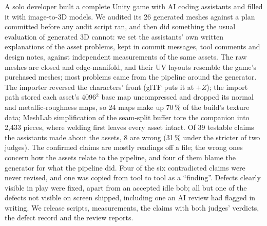 A solo developer built a complete Unity game with AI coding assistants and filled
it with image-to-3D models. We audited its 26 generated meshes against a plan
committed before any audit script ran, and then did something the usual
evaluation of generated 3D cannot: we set the assistants' own written
explanations of the asset problems, kept in commit messages, tool comments and
design notes, against independent measurements of the same assets. The raw
meshes are closed and edge-manifold, and their UV layouts resemble the game's
purchased meshes; most problems came from the pipeline around the generator. The
importer reversed the characters' front (glTF puts it at $+Z$); the import path
stored each asset's 4096$^2$ base map uncompressed and dropped its normal and
metallic-roughness maps, so 24 maps make up 70\,\% of the build's texture data;
MeshLab simplification of the seam-split buffer tore the companion into 2,433
pieces, where welding first leaves every asset intact. Of 39 testable claims the
assistants made about the assets, 8 are wrong (31\,\% under the stricter of two
judges). The confirmed claims are mostly readings off a file; the wrong ones
concern how the assets relate to the pipeline, and four of them blame the
generator for what the pipeline did. Four of the six contradicted claims were
never revised, and one was copied from tool to tool as a ``finding''. Defects
clearly visible in play were fixed, apart from an accepted idle bob; all but one
of the defects not visible on screen shipped, including one an AI review had
flagged in writing. We release
scripts, measurements, the claims with both judges' verdicts, the defect record
and the review reports.
